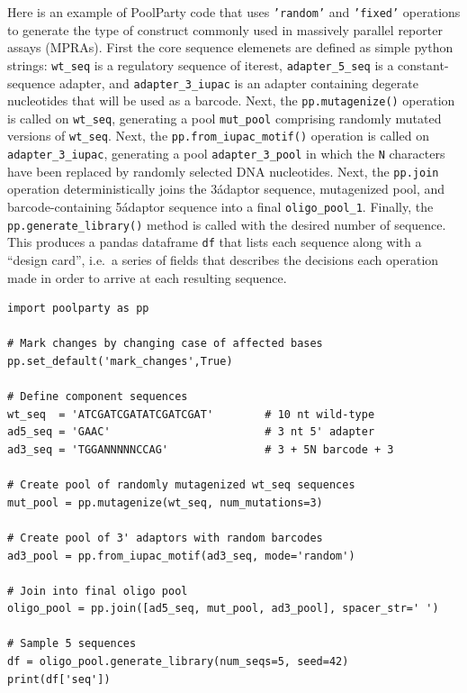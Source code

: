 \documentclass[11pt]{article}
\newcommand{\inpy}[1]{\texttt{#1}}
\begin{document}
Here is an example of PoolParty code that uses \inpy{'random'} and \inpy{'fixed'} operations to generate the type of construct commonly used in massively parallel reporter assays (MPRAs). First the core sequence elemenets are defined as simple python strings: \inpy{wt_seq} is a regulatory sequence of iterest, \inpy{adapter_5_seq} is a constant-sequence adapter, and \inpy{adapter_3_iupac} is an adapter containing degerate nucleotides that will be used as a barcode. Next, the \inpy{pp.mutagenize()} operation is called on \inpy{wt_seq}, generating a pool \inpy{mut_pool} comprising randomly mutated versions of \inpy{wt_seq}. Next, the \inpy{pp.from_iupac_motif()} operation is called on \inpy{adapter_3_iupac}, generating a pool \inpy{adapter_3_pool} in which the \inpy{N} characters have been replaced by randomly selected DNA nucleotides. Next, the \inpy{pp.join} operation deterministically joins the 3\' adaptor sequence, mutagenized pool, and barcode-containing 5\' adaptor sequence into a final \inpy{oligo_pool_1}. Finally, the \inpy{pp.generate_library()} method is called with the desired number of sequence. This produces a pandas dataframe \inpy{df} that lists each sequence along with a ``design card'', i.e.\ a series of fields that describes the decisions each operation made in order to arrive at each resulting sequence. 

\begin{verbatim}
import poolparty as pp

# Mark changes by changing case of affected bases
pp.set_default('mark_changes',True)

# Define component sequences 
wt_seq  = 'ATCGATCGATATCGATCGAT'        # 10 nt wild-type
ad5_seq = 'GAAC'                        # 3 nt 5' adapter
ad3_seq = 'TGGANNNNNCCAG'               # 3 + 5N barcode + 3

# Create pool of randomly mutagenized wt_seq sequences
mut_pool = pp.mutagenize(wt_seq, num_mutations=3)

# Create pool of 3' adaptors with random barcodes
ad3_pool = pp.from_iupac_motif(ad3_seq, mode='random')

# Join into final oligo pool
oligo_pool = pp.join([ad5_seq, mut_pool, ad3_pool], spacer_str=' ')

# Sample 5 sequences
df = oligo_pool.generate_library(num_seqs=5, seed=42)
print(df['seq'])
\end{verbatim}
\end{document}
